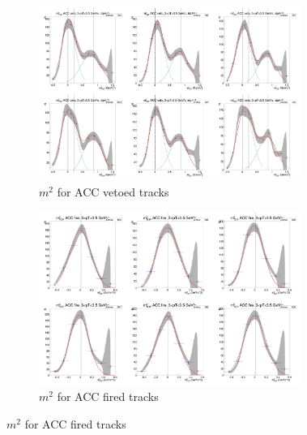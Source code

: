 \begin{figure}[H]
  \ContinuedFloat
    \begin{subfigure}{1\textwidth}
   \centering
   \includegraphics[width=0.94\textwidth]{hiptfits/neg/PSm2_cent0_ich0_accfire0_ptbin12.jpg}
    \caption{$m^2$ for ACC vetoed tracks}
    \end{subfigure}
    \begin{subfigure}{1\textwidth}
   \centering
   \includegraphics[width=0.94\textwidth]{hiptfits/neg/PSm2_cent0_ich0_accfire1_ptbin12.jpg}
    \caption{$m^2$ for ACC fired tracks}
    \end{subfigure}  
\end{figure}
